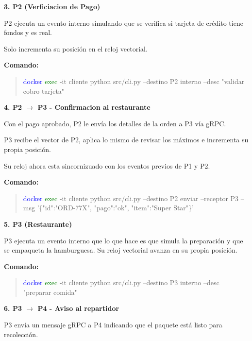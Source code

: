 \documentclass[letterpaper,11pt]{article}
\begin{document}
\textbf{3. P2 (Verficiacion de Pago)}

P2 ejecuta un evento interno simulando que se verifica si tarjeta de crédito tiene fondos y es real. 

Solo incrementa su posición en el reloj vectorial.

\begin{center}
  \textbf{Comando:}
\end{center}

\begin{quote}
\textcolor{blue}{docker} \textcolor{green}{exec} -it cliente python src/cli.py --destino P2 interno --desc "validar cobro tarjeta"
\end{quote}

\textbf{4. P2 $\rightarrow$ P3 - Confirmacion al restaurante}

Con el pago aprobado, P2 le envía los detalles de la orden a P3 vía gRPC. 

P3 recibe el vector de P2, aplica lo mismo de revisar los máximos e incrementa su propia posición. 

Su reloj ahora esta sincornizuado con los eventos previos de P1 y P2.

\begin{center}
  \textbf{Comando:}
\end{center}

\begin{quote}
\textcolor{blue}{docker} \textcolor{green}{exec} -it cliente python src/cli.py --destino P2 enviar --receptor P3 --msg '\{"id":"ORD-77X", "pago":"ok", "item":"Super Star"\}'
\end{quote}

\textbf{5. P3 (Restaurante)}

P3 ejecuta un evento interno que lo que hace es que simula la preparación y que se empaqueta la hamburguesa. 
Su reloj vectorial avanza en su propia posición.

\newpage
\begin{center}
  \textbf{Comando:}
\end{center}

\begin{quote}
\textcolor{blue}{docker} \textcolor{green}{exec} -it cliente python src/cli.py --destino P3 interno --desc "preparar comida"
\end{quote}


\textbf{6. P3 $\rightarrow$ P4 - Aviso al repartidor}

P3 envía un mensaje gRPC a P4 indicando que el paquete está listo para recolección. 
\end{document}
